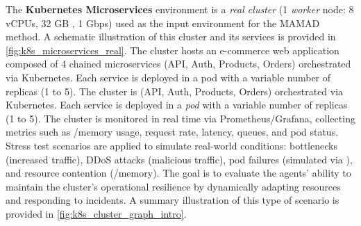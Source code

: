The \textbf{Kubernetes Microservices} environment is a \emph{real cluster} (1 \textit{worker} node: 8 vCPUs, 32 GB , 1 Gbps) used as the input environment for the MAMAD method. A schematic illustration of this cluster and its services is provided in \autoref{fig:k8s_microservices_real}. The cluster hosts an e-commerce web application composed of 4 chained microservices (API, Auth, Products, Orders) orchestrated via Kubernetes. Each service is deployed in a pod with a variable number of replicas (1 to 5). The cluster is ({API}, Auth, Products, Orders) orchestrated via Kubernetes. Each service is deployed in a \emph{pod} with a variable number of replicas (1 to 5). The cluster is monitored in real time via Prometheus/Grafana, collecting metrics such as /memory usage, request rate, latency, queues, and pod status. Stress test scenarios are applied to simulate real-world conditions: bottlenecks (increased traffic), DDoS attacks (malicious traffic), pod failures (simulated via ), and resource contention (/memory). The goal is to evaluate the agents' ability to maintain the cluster's operational resilience by dynamically adapting resources and responding to incidents. A summary illustration of this type of scenario is provided in \autoref{fig:k8s_cluster_graph_intro}.


